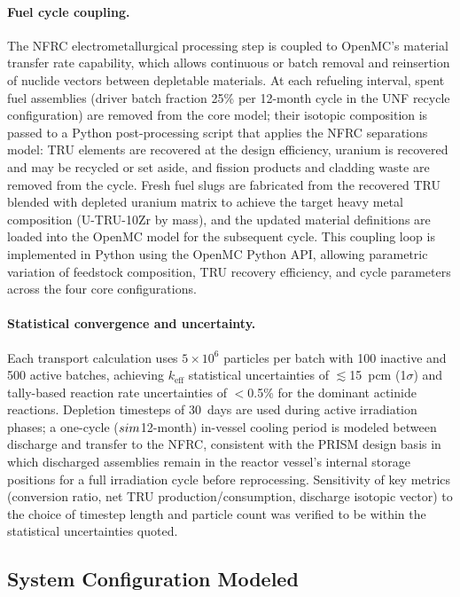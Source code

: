 \documentclass[10pt,twoside]{article}
\begin{document}
\paragraph{Fuel cycle coupling.}
The NFRC electrometallurgical processing step is
coupled to OpenMC's material transfer rate capability, which allows continuous or
batch removal and reinsertion of nuclide vectors between depletable
materials.\cite{OpenMC_depletion_docs}  At each refueling interval,
spent fuel assemblies (driver batch fraction 25\% per 12-month cycle
in the UNF recycle configuration) are removed from the core model;
their isotopic composition is passed to a Python post-processing
script that applies the NFRC separations model: TRU elements are
recovered at the design efficiency, uranium is recovered and may be
recycled or set aside, and fission products and cladding waste are
removed from the cycle.  Fresh fuel slugs are fabricated from the
recovered TRU blended with depleted uranium matrix to achieve the
target heavy metal composition (U-TRU-10Zr by mass), and the
updated material definitions are loaded into the OpenMC model for
the subsequent cycle.  This coupling loop is implemented in Python
using the OpenMC Python API, allowing parametric variation of
feedstock composition, TRU recovery efficiency, and cycle parameters
across the four core configurations.

\paragraph{Statistical convergence and uncertainty.}
Each transport calculation uses $5 \times 10^6$ particles per batch
with 100 inactive and 500 active batches, achieving $k_\text{eff}$
statistical uncertainties of $\lesssim$15~pcm (1$\sigma$) and
tally-based reaction rate uncertainties of $<$0.5\% for the dominant
actinide reactions.  Depletion timesteps of 30~days are used during
active irradiation phases; a one-cycle ($\\sim$12-month) in-vessel cooling period is modeled
between discharge and transfer to the NFRC, consistent with the PRISM
design basis in which discharged assemblies remain in the reactor vessel's
internal storage positions for a full irradiation cycle before
reprocessing.  Sensitivity of key metrics
(conversion ratio, net TRU production/consumption, discharge isotopic
vector) to the choice of timestep length and particle count was
verified to be within the statistical uncertainties quoted.

\subsection{System Configuration Modeled}
\end{document}
